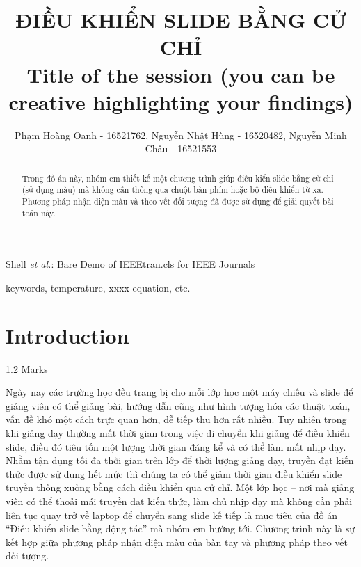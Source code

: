 \documentclass[journal]{IEEEtran}
\begin{document}
\title{ĐIỀU KHIỂN SLIDE BẰNG CỬ CHỈ \\
\small{Title of the session (you can be creative highlighting your findings)}}

\author{Phạm Hoàng Oanh - 16521762,
        Nguyễn Nhật Hùng - 16520482,
        Nguyễn Minh Châu - 16521553}%
        
{Shell \MakeLowercase{\textit{et al.}}: Bare Demo of IEEEtran.cls for IEEE Journals}

\maketitle

\begin{abstract} 
Trong đồ án này, nhóm em thiết kế một chương trình giúp điều kiển slide bằng cử chỉ (sử dụng màu) mà không cần thông qua chuột bàn phím hoặc bộ điều khiển từ xa. Phương pháp nhận diện màu và theo vết đối tượng đã được sử dụng để giải quyết bài toán này.
\end{abstract}

\begin{IEEEkeywords}
keywords, temperature, xxxx equation, etc.
\end{IEEEkeywords}

\section{Introduction   }
\begin{flushright} 1.2 Marks \end{flushright}


 Ngày nay các trường học đều trang bị cho mỗi lớp học một máy chiếu và slide để giảng viên có thể giảng bài, hướng dẫn cũng như hình tượng hóa các thuật toán, vấn đề khó một cách trực quan hơn, dễ tiếp thu hơn rất nhiều. Tuy nhiên trong khi giảng dạy thường mất thời gian trong việc di chuyển khi giảng để điều khiển slide, điều đó tiêu tốn một lượng thời gian đáng kể và có thể làm mất nhịp dạy. Nhằm tận dụng tối đa thời gian trên lớp để thời lượng giảng dạy, truyền đạt kiến thức được sử dụng hết mức thì chúng ta có thể giảm thời gian điều khiển slide truyền thống xuống bằng cách điều khiển qua cử chỉ. Một lớp học – nơi mà giảng viên có thể thoải mái truyền đạt kiến thức, làm chủ nhịp dạy mà không cần phải liên tục quay trở về laptop để chuyển sang slide kế tiếp là mục tiêu của đồ án “Điều khiển slide bằng động tác” mà nhóm em hướng tới.
Chương trình này là sự kết hợp giữa phương pháp nhận diện màu của bàn tay và phương pháp theo vết đối tượng.
\end{document}
